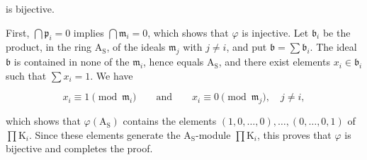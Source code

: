 is bijective.

First, $\bigcap\mathfrak{p}_i=0$ implies $\bigcap\mathfrak{m}_i=0$, which shows that $\varphi$ is injective. Let $\mathfrak{b}_i$ be the product, in the ring $\mathrm{A}_\mathrm{S}$, of the ideals $\mathfrak{m}_j$ with $j\neq i$, and put $\mathfrak{b}=\sum\mathfrak{b}_i$. The ideal $\mathfrak{b}$ is contained in none of the $\mathfrak{m}_i$, hence equals $\mathrm{A}_\mathrm{S}$, and there exist elements $x_i\in\mathfrak{b}_i$ such that $\sum x_i=1$. We have

\begin{equation*}
x_i\equiv1\pmod{\mathfrak{m}_i}
\qquad\text{and}\qquad
x_i\equiv0\pmod{\mathfrak{m}_j},\quad j\neq i,
\end{equation*}

which shows that $\varphi(\mathrm{A}_\mathrm{S})$ contains the elements $(1,0,\ldots,0),\ldots,(0,\ldots,0,1)$ of $\prod \mathrm{K}_i$. Since these elements generate the $\mathrm{A}_\mathrm{S}$-module $\prod \mathrm{K}_i$, this proves that $\varphi$ is bijective and completes the proof.
